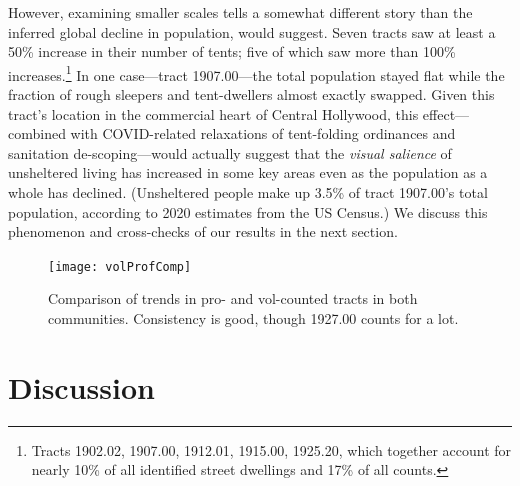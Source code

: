 \documentclass[11pt,twocolumn]{article}
\begin{document}
However, examining smaller scales tells a somewhat different story than the inferred global decline 
in population, would suggest. Seven tracts saw at least a 50\% increase in their number of tents; five 
of which saw more than 100\% increases.\footnote{Tracts 1902.02, 1907.00, 1912.01, 1915.00, 1925.20,
which together account for nearly 10\% of all identified street dwellings and 17\%
of all counts.} 
In one case---tract 1907.00---the total population stayed flat
while the fraction of rough sleepers and tent-dwellers almost exactly swapped. Given this tract's location
in the commercial heart of Central Hollywood, this effect---combined with COVID-related relaxations of 
tent-folding ordinances and sanitation de-scoping---would actually suggest that the {\it visual salience}
of unsheltered living has increased in some key areas even as the population as a whole has declined.
(Unsheltered people make up 3.5\% of tract 1907.00's total population, according to 2020 estimates
from the US Census.) We discuss this phenomenon and cross-checks of our results in the next section.

\begin{figure}[]
	\centering
	\texttt{[image: volProfComp]}
	\caption{Comparison of trends in pro- and vol-counted tracts in both communities.
			Consistency is good, though 1927.00 counts for a lot.}
	\label{fig:proVolComp}
\end{figure}

\section{Discussion}
\label{sec:discussion}

\end{document}
